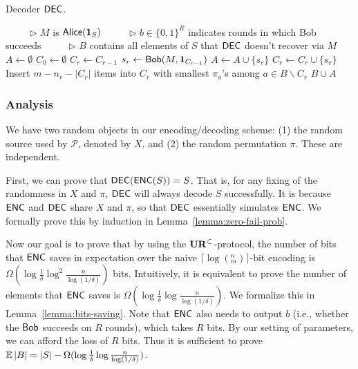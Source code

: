 \begin{algorithm}[H] 
  \caption{Decoder $\textsf{DEC}$.} \label{algo:dec}
  \begin{algorithmic}[1]
    \Statex \ \ \ \ \ $\triangleright$ $M$ is $\mathsf{Alice}(\mathbf{1}_S)$
    \Statex \ \ \ \ \ $\triangleright$ $b\in\{0,1\}^R$ indicates rounds in which Bob succeeds
    \Statex \ \ \ \ \ $\triangleright$ $B$ contains all elements of $S$ that $\textsf{DEC}$ doesn't recover via $M$
    \State $A\leftarrow \emptyset$ 
    \State $C_0 \leftarrow \emptyset$ 
     
      \State $C_r\leftarrow C_{r-1}$
       
        \State $s_r\leftarrow \mathsf{Bob}(M, \mathbf{1}_{C_{r-1}})$ 
        \State $A\leftarrow A \cup \{s_r\}$
        \State $C_r\leftarrow C_r \cup \{s_r\}$
      \EndIf
       \State Insert $m-n_r-|C_r|$ items into $C_r$ with smallest $\pi_a$'s among $a\in B\backslash C_r$
       \Statex {}
    \EndFor
    \State \Return $B\cup A$ 
    \EndProcedure
  \end{algorithmic}
\end{algorithm}

\subsubsection{Analysis}

We have two random objects in our encoding/decoding scheme: (1) the random source used by $\mathcal{P}$, denoted by $X$, and (2) the random permutation $\pi$. These are independent.

First, we can prove that $\textsf{DEC}(\textsf{ENC}(S))=S$.  That is, for any fixing of the randomness in $X$ and $\pi$, $\textsf{DEC}$ will always decode $S$ successfully.  It is because $\textsf{ENC}$ and $\textsf{DEC}$ share $X$ and $\pi$, so that $\textsf{DEC}$ essentially simulates $\textsf{ENC}$.  We formally prove this by induction in Lemma~\ref{lemma:zero-fail-prob}.

Now our goal is to prove that by using the $\mathbf{UR}^\subset$-protocol, the number of bits that $\textsf{ENC}$ saves in expectation over the naive $\lceil\log(^n_m)\rceil$-bit encoding is $\Omega(\log \frac{1}{\delta}\log^2 \frac{n}{\log (1/\delta)} )$ bits.  Intuitively, it is equivalent to prove the number of elements that $\textsf{ENC}$ saves is $\Omega(\log \frac{1}{\delta}\log \frac{n}{\log (1/\delta)} )$.
We formalize this in Lemma~\ref{lemma:bits-saving}. 
Note that $\textsf{ENC}$ also needs to output $b$ (i.e., whether the $\mathsf{Bob}$ succeeds on $R$ rounds), which takes $R$ bits. 
By our setting of parameters, we can afford the loss of $R$ bits.  Thus it is sufficient to prove $\operatorname*{\mathbb{E}}|B|=|S|-\Omega(\log \frac{1}{\delta}\log \frac{n}{\log (1/\delta)})$. 

